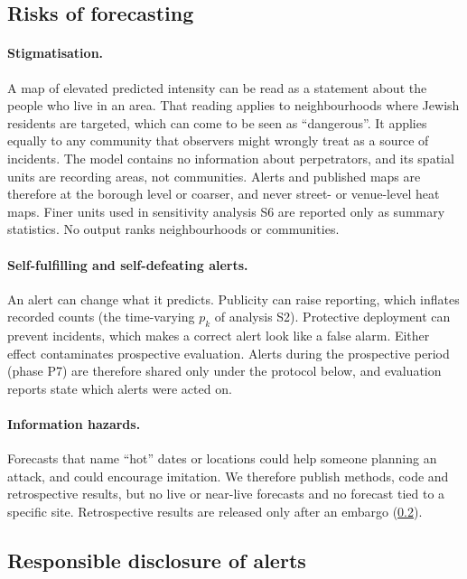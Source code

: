 \subsection{Risks of forecasting}\label{sec:ethics-risks}

\paragraph{Stigmatisation.}
A map of elevated predicted intensity can be read as a statement about the
people who live in an area. That reading applies to neighbourhoods where
Jewish residents are targeted, which can come to be seen as ``dangerous''.
It applies equally to any community that observers might wrongly treat as a
source of incidents. The model contains no information about perpetrators,
and its spatial units are recording areas, not communities. Alerts and published maps are therefore
at the borough level or coarser, and never street- or venue-level heat maps.
Finer units used in sensitivity analysis S6 are reported only as summary
statistics. No output ranks neighbourhoods or communities.

\paragraph{Self-fulfilling and self-defeating alerts.}
An alert can change what it predicts. Publicity can raise reporting, which
inflates recorded counts (the time-varying $p_k$ of analysis S2). Protective
deployment can prevent incidents, which makes a correct alert look like a
false alarm. Either effect contaminates prospective evaluation. Alerts
during the prospective period (phase P7) are therefore shared only under the
protocol below, and evaluation reports state which alerts were acted on.

\paragraph{Information hazards.}
Forecasts that name ``hot'' dates or locations could help someone planning
an attack, and could encourage imitation. We therefore publish methods,
code and retrospective results, but no live or near-live forecasts and no
forecast tied to a specific site. Retrospective results are released only
after an embargo (\cref{sec:ethics-disclosure}).

\subsection{Responsible disclosure of alerts}\label{sec:ethics-disclosure}

